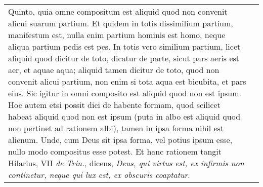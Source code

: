 \documentclass[10pt]{jsarticle} %
\begin{document}
\begin{longtable}{p{21em}p{21em}}
\\

Quinto, quia omne compositum est aliquid quod non convenit alicui suarum
 partium. Et quidem in totis dissimilium partium, manifestum est, nulla
 enim partium hominis est homo, neque aliqua partium pedis est pes. In
 totis vero similium partium, licet aliquid quod dicitur de toto,
 dicatur de parte, sicut pars aeris est aer, et aquae aqua; aliquid
 tamen dicitur de toto, quod non convenit alicui partium, non enim si
 tota aqua est bicubita, et pars eius. Sic igitur in omni composito est
 aliquid quod non est ipsum. Hoc autem etsi possit dici de habente
 formam, quod scilicet habeat aliquid quod non est ipsum (puta in albo
 est aliquid quod non pertinet ad rationem albi), tamen in ipsa forma
 nihil est alienum. Unde, cum Deus sit ipsa forma, vel potius ipsum
 esse, nullo modo compositus esse potest. Et hanc rationem tangit
 Hilarius, VII {\itshape de Trin.}, dicens, {\itshape Deus, qui virtus
 est, ex infirmis non continetur, neque qui lux est, ex obscuris
 coaptatur}.

&


\end{longtable}
\end{document}
